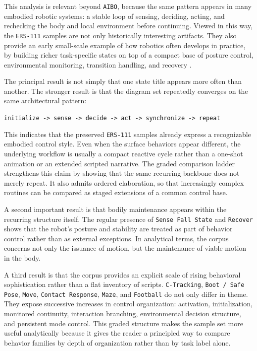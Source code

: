 \documentclass[11pt]{article}
\begin{document}
This analysis is relevant beyond \texttt{AIBO}, because the same
pattern appears in many embodied robotic systems: a stable loop of
sensing, deciding, acting, and rechecking the body and local
environment before continuing. Viewed in this way, the
\texttt{ERS-111} samples are not only historically interesting
artifacts. They also provide an early small-scale example of how
robotics often develops in practice, by building richer task-specific
states on top of a compact base of posture control, environmental
monitoring, transition handling, and recovery \cite{kawaharazuka2024realworld,xu2024survey}.

The principal result is not simply that one state title appears more
often than another. The stronger result is that the diagram set
repeatedly converges on the same architectural pattern:

\begin{center}
\texttt{initialize -> sense -> decide -> act -> synchronize -> repeat}
\end{center}

This indicates that the preserved \texttt{ERS-111} samples already
express a recognizable embodied control style. Even when the surface
behaviors appear different, the underlying workflow is usually a
compact reactive cycle rather than a one-shot animation or an extended
scripted narrative. The graded comparison ladder strengthens this claim
by showing that the same recurring backbone does not merely repeat. It
also admits ordered elaboration, so that increasingly complex routines
can be compared as staged extensions of a common control base.

A second important result is that bodily maintenance appears within the
recurring structure itself. The regular presence of \texttt{Sense Fall
State} and \texttt{Recover} shows that the robot's posture and
stability are treated as part of behavior control rather than as
external exceptions. In analytical terms, the corpus concerns not only
the issuance of motion, but the maintenance of viable motion in the
body.

A third result is that the corpus provides an explicit scale of rising
behavioral sophistication rather than a flat inventory of scripts.
\texttt{C-Tracking}, \texttt{Boot / Safe Pose}, \texttt{Move},
\texttt{Contact Response}, \texttt{Maze}, and \texttt{Football} do not
only differ in theme. They expose successive increases in control
organization: activation, initialization, monitored continuity,
interaction branching, environmental decision structure, and persistent
mode control. This graded structure makes the sample set more useful
analytically because it gives the reader a principled way to compare
behavior families by depth of organization rather than by task label
alone.
\end{document}
